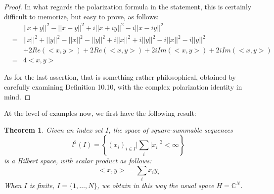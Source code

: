 \documentclass[12pt]{amsbook}
\newtheorem{theorem}{Theorem}[chapter]
\begin{document}
\begin{proof}
In what regards the polarization formula in the statement, this is certainly difficult to memorize, but easy to prove, as follows:
\begin{eqnarray*}
&&||x+y||^2-||x-y||^2+i||x+iy||^2-i||x-iy||^2\\
&=&||x||^2+||y||^2-||x||^2-||y||^2+i||x||^2+i||y||^2-i||x||^2-i||y||^2\\
&&+2Re(<x,y>)+2Re(<x,y>)+2iIm(<x,y>)+2iIm(<x,y>)\\
&=&4<x,y>
\end{eqnarray*}

As for the last assertion, that is something rather philosophical, obtained by carefully examining Definition 10.10, with the complex polarization identity in mind.
\end{proof}

At the level of examples now, we first have the following result:


\begin{theorem}
Given an index set $I$, the space of square-summable sequences
$$l^2(I)=\left\{(x_i)_{i\in I}\Big|\sum_i|x_i|^2<\infty\right\}$$
is a Hilbert space, with scalar product as follows:
$$<x,y>=\sum_ix_i\bar{y}_i$$
When $I$ is finite, $I=\{1,\ldots,N\}$, we obtain in this way the usual space $H=\mathbb C^N$.
\end{theorem}
\end{document}
